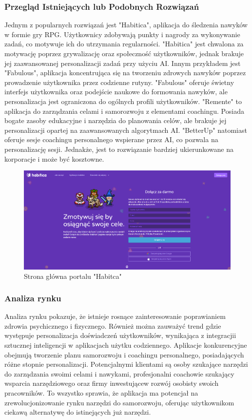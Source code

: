 \subsubsection{Przegląd Istniejących lub Podobnych Rozwiązań}
Jednym z popularnych rozwiązań jest "Habitica", aplikacja do śledzenia nawyków w formie gry RPG. Użytkownicy zdobywają punkty i nagrody za wykonywanie zadań, co motywuje ich do utrzymania regularności. "Habitica" jest chwalona za motywację poprzez grywalizację oraz społeczność użytkowników, jednak brakuje jej zaawansowanej personalizacji zadań przy użyciu AI.
Innym przykładem jest "Fabulous", aplikacja koncentrująca się na tworzeniu zdrowych nawyków poprzez prowadzenie użytkownika przez codzienne rutyny. "Fabulous" oferuje świetny interfejs użytkownika oraz podejście naukowe do formowania nawyków, ale personalizacja jest ograniczona do ogólnych profili użytkowników.
"Remente" to aplikacja do zarządzania celami i samorozwoju z elementami coachingu. Posiada bogate zasoby edukacyjne i narzędzia do planowania celów, ale brakuje jej personalizacji opartej na zaawansowanych algorytmach AI. "BetterUp" natomiast oferuje sesje coachingu personalnego wspierane przez AI, co pozwala na personalizację sesji. Jednakże, jest to rozwiązanie bardziej ukierunkowane na korporacje i może być kosztowne.

\begin{figure}[H]
    \centering
    \includegraphics[width=1\linewidth]{Obrazy/habitcaSignIn.png}
    \caption{Strona główna portalu "Habitca"}
    \label{fig:enter-label}
\end{figure}

\subsubsection{Analiza rynku}
Analiza rynku pokazuje, że istnieje rosnące zainteresowanie poprawianiem zdrowia psychicznego i fizycznego. Również można zauważyć trend gdzie występuje personalizacja doświadczeń użytkowników, wynikająca z integracjii sztucznej inteligencji w aplikacjach użytku codziennego. Aplikacje konkurencyjne obejmują tworzenie planu samorozwoju i coachingu personalnego, posiadających różne stopnie personalizacji. Potencjalnymi klientami są osoby szukające narzędzi do zarządzania swoimi celami i nawykami, profesjonalni coachowie szukający wsparcia narzędziowego oraz firmy inwestujące\linebreak w rozwój osobisty swoich pracowników.
To wszystko sprawia, że aplikacja ma potencjał na zrewolucjonizowanie rynku narzędzi do samorozwoju, oferując użytkownikom ciekawą alternatywę do istinejących już narzędzi.

